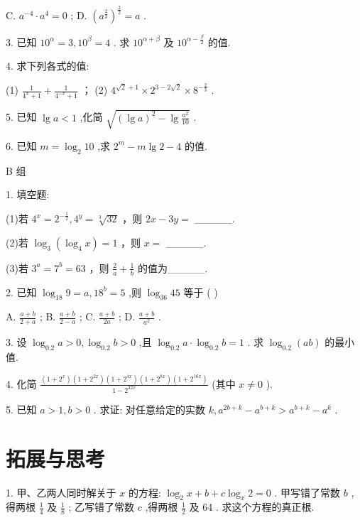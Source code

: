 \documentclass[10pt]{article}
\begin{document}
C. \({a}^{-4} \cdot  {a}^{4} = 0\) ; D. \({\left( {a}^{\frac{2}{3}}\right) }^{\frac{3}{2}} = a\) .

3. 已知 \({10}^{\alpha } = 3,{10}^{\beta } = 4\) . 求 \({10}^{\alpha  + \beta }\) 及 \({10}^{\alpha  - \frac{\beta }{2}}\) 的值.

4. 求下列各式的值:

(1) \(\frac{1}{{4}^{x} + 1} + \frac{1}{{4}^{-x} + 1}\) ； (2) \({4}^{\sqrt{2} + 1} \times  {2}^{3 - 2\sqrt{2}} \times  {8}^{-\frac{2}{3}}\) .

5. 已知 \(\lg a < 1\) ,化简 \(\sqrt{{\left( \lg a\right) }^{2} - \lg \frac{{a}^{2}}{10}}\) .

6. 已知 \(m = {\log }_{2}{10}\) ,求 \({2}^{m} - m\lg 2 - 4\) 的值.

B 组

1. 填空题:

(1)若 \({4}^{x} = {2}^{-\frac{1}{2}},{4}^{y} = \sqrt[3]{32}\) ，则 \({2x} - {3y} =\) \_\_\_\_\_.

(2)若 \({\log }_{3}\left( {{\log }_{4}x}\right)  = 1\) ，则 \(x =\) \_\_\_\_\_.

(3)若 \({3}^{a} = {7}^{b} = {63}\) ，则 \(\frac{2}{a} + \frac{1}{b}\) 的值为\_\_\_\_\_.

2. 已知 \({\log }_{18}9 = a,{18}^{b} = 5\) ,则 \({\log }_{36}{45}\) 等于 ( )

A. \(\frac{a + b}{2 + a}\) ; B. \(\frac{a + b}{2 - a}\) ; C. \(\frac{a + b}{2a}\) ; D. \(\frac{a + b}{{a}^{2}}\) .

3. 设 \({\log }_{0.2}a > 0,{\log }_{0.2}b > 0\) ,且 \({\log }_{0.2}a \cdot  {\log }_{0.2}b = 1\) . 求 \({\log }_{0.2}\left( {ab}\right)\) 的最小值.

4. 化简 \(\frac{\left( {1 + {2}^{x}}\right) \left( {1 + {2}^{2x}}\right) \left( {1 + {2}^{4x}}\right) \left( {1 + {2}^{8x}}\right) \left( {1 + {2}^{16x}}\right) }{1 - {2}^{32x}}\) (其中 \(x \neq  0\) ).

5. 已知 \(a > 1,b > 0\) . 求证: 对任意给定的实数 \(k,{a}^{{2b} + k} - {a}^{b + k} > {a}^{b + k} - {a}^{k}\) .

\section*{拓展与思考}

1. 甲、乙两人同时解关于 \(x\) 的方程: \({\log }_{2}x + b + c{\log }_{x}2 = 0\) . 甲写错了常数 \(b\) ,得两根 \(\frac{1}{4}\) 及 \(\frac{1}{8}\) ; 乙写错了常数 \(c\) ,得两根 \(\frac{1}{2}\) 及 64 . 求这个方程的真正根.
\end{document}
